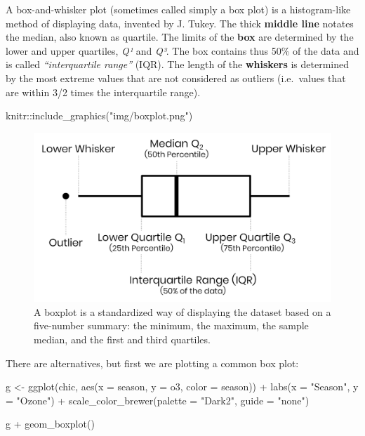 \documentclass[
]{krantz}
\makeatletter
\newenvironment{Shaded}{\begin{snugshade}}{\end{snugshade}}
\newcommand{\AttributeTok}[1]{\textcolor[rgb]{0.61,0.61,0.61}{#1}}
\newcommand{\FunctionTok}[1]{\textcolor[rgb]{0,0,0}{#1}}
\newcommand{\NormalTok}[1]{#1}
\newcommand{\OtherTok}[1]{\textcolor[rgb]{0.37,0.37,0.37}{#1}}
\newcommand{\SpecialCharTok}[1]{\textcolor[rgb]{0,0,0}{#1}}
\newcommand{\StringTok}[1]{\textcolor[rgb]{0.5,0.5,0.5}{#1}}
\newenvironment{kframe}{%
\medskip{}
\setlength{\fboxsep}{.8em}
 \def\at@end@of@kframe{}%
 \ifinner\ifhmode%
  \def\at@end@of@kframe{\end{minipage}}%
  \begin{minipage}{\columnwidth}%
 \fi\fi%
 \def\FrameCommand##1{\hskip\@totalleftmargin \hskip-\fboxsep
 \colorbox{shadecolor}{##1}\hskip-\fboxsep
     \hskip-\linewidth \hskip-\@totalleftmargin \hskip\columnwidth}%
 \MakeFramed {\advance\hsize-\width
   \@totalleftmargin\z@ \linewidth\hsize
   \@setminipage}}%
 {\par\unskip\endMakeFramed%
 \at@end@of@kframe}
\renewenvironment{Shaded}{\begin{kframe}}{\end{kframe}}
\makeatother
\begin{document}
A box-and-whisker plot (sometimes called simply a box plot) is a histogram-like method of displaying data, invented by J. Tukey. The thick \textbf{middle line} notates the median, also known as quartile. The limits of the \textbf{box} are determined by the lower and upper quartiles, \emph{Q¹} and \emph{Q³}. The box contains thus 50\% of the data and is called \emph{``interquartile range''} (IQR). The length of the \textbf{whiskers} is determined by the most extreme values that are not considered as outliers (i.e.~values that are within 3/2 times the interquartile range).

\begin{Shaded}
\begin{Highlighting}[]
\NormalTok{knitr}\SpecialCharTok{::}\FunctionTok{include\_graphics}\NormalTok{(}\StringTok{"img/boxplot.png"}\NormalTok{)}
\end{Highlighting}
\end{Shaded}

\begin{figure}
\includegraphics[width=23.83in]{img/boxplot} \caption{A boxplot is a standardized way of displaying the dataset based on a five-number summary: the minimum, the maximum, the sample median, and the first and third quartiles.}\label{fig:img-boxplot}
\end{figure}

There are alternatives, but first we are plotting a common box plot:

\begin{Shaded}
\begin{Highlighting}[]
\NormalTok{g }\OtherTok{\textless{}{-}}
  \FunctionTok{ggplot}\NormalTok{(chic, }\FunctionTok{aes}\NormalTok{(}\AttributeTok{x =}\NormalTok{ season, }\AttributeTok{y =}\NormalTok{ o3,}
                   \AttributeTok{color =}\NormalTok{ season)) }\SpecialCharTok{+}
    \FunctionTok{labs}\NormalTok{(}\AttributeTok{x =} \StringTok{"Season"}\NormalTok{, }\AttributeTok{y =} \StringTok{"Ozone"}\NormalTok{) }\SpecialCharTok{+}
    \FunctionTok{scale\_color\_brewer}\NormalTok{(}\AttributeTok{palette =} \StringTok{"Dark2"}\NormalTok{, }\AttributeTok{guide =} \StringTok{"none"}\NormalTok{)}

\NormalTok{g }\SpecialCharTok{+} \FunctionTok{geom\_boxplot}\NormalTok{()}
\end{Highlighting}
\end{Shaded}
\end{document}
